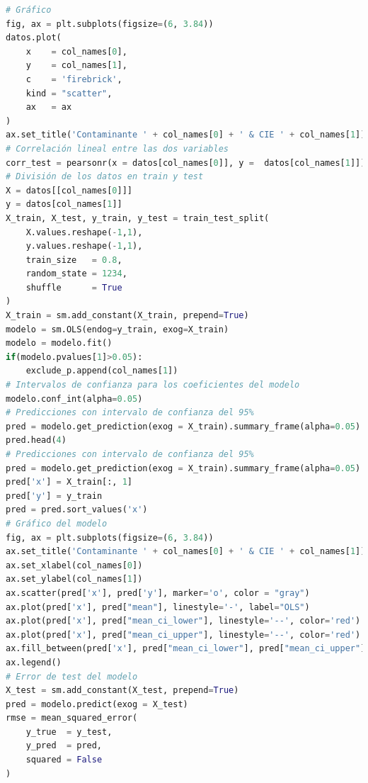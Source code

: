 \clearpage
\begin{lstlisting}[language=Python, caption=Generación de los modelos de regresión lineal., label=lst:c4]
# Gráfico
fig, ax = plt.subplots(figsize=(6, 3.84))
datos.plot(
    x    = col_names[0],
    y    = col_names[1],
    c    = 'firebrick',
    kind = "scatter",
    ax   = ax
)
ax.set_title('Contaminante ' + col_names[0] + ' & CIE ' + col_names[1])
# Correlación lineal entre las dos variables
corr_test = pearsonr(x = datos[col_names[0]], y =  datos[col_names[1]])
# División de los datos en train y test
X = datos[[col_names[0]]]
y = datos[col_names[1]]
X_train, X_test, y_train, y_test = train_test_split(
    X.values.reshape(-1,1),
    y.values.reshape(-1,1),
    train_size   = 0.8,
    random_state = 1234,
    shuffle      = True
)
X_train = sm.add_constant(X_train, prepend=True)
modelo = sm.OLS(endog=y_train, exog=X_train)
modelo = modelo.fit()
if(modelo.pvalues[1]>0.05):
    exclude_p.append(col_names[1])
# Intervalos de confianza para los coeficientes del modelo
modelo.conf_int(alpha=0.05)
# Predicciones con intervalo de confianza del 95%
pred = modelo.get_prediction(exog = X_train).summary_frame(alpha=0.05)
pred.head(4)        
# Predicciones con intervalo de confianza del 95%
pred = modelo.get_prediction(exog = X_train).summary_frame(alpha=0.05)
pred['x'] = X_train[:, 1]
pred['y'] = y_train
pred = pred.sort_values('x')
# Gráfico del modelo
fig, ax = plt.subplots(figsize=(6, 3.84))
ax.set_title('Contaminante ' + col_names[0] + ' & CIE ' + col_names[1])
ax.set_xlabel(col_names[0])
ax.set_ylabel(col_names[1])
ax.scatter(pred['x'], pred['y'], marker='o', color = "gray")
ax.plot(pred['x'], pred["mean"], linestyle='-', label="OLS")
ax.plot(pred['x'], pred["mean_ci_lower"], linestyle='--', color='red')
ax.plot(pred['x'], pred["mean_ci_upper"], linestyle='--', color='red')
ax.fill_between(pred['x'], pred["mean_ci_lower"], pred["mean_ci_upper"], 0.1)
ax.legend()
# Error de test del modelo 
X_test = sm.add_constant(X_test, prepend=True)
pred = modelo.predict(exog = X_test)
rmse = mean_squared_error(
    y_true  = y_test,
    y_pred  = pred,
    squared = False
)
\end{lstlisting}

